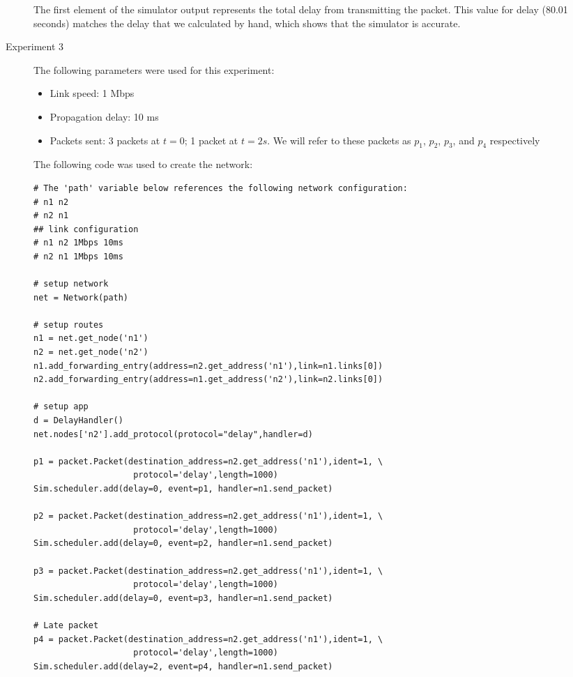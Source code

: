 \documentclass[11pt]{article}
\begin{document}
\begin{description}
\medskip

The first element of the simulator output represents the total delay from transmitting the packet. This value for delay (80.01 seconds) matches the delay that we calculated by hand, which shows that the simulator is accurate.

\item[Experiment 3] \hfill \break
The following parameters were used for this experiment:

\begin{itemize}
\item Link speed: 1 Mbps
\item Propagation delay: 10 ms
\item Packets sent: 3 packets at $t = 0$; 1 packet at $t = 2s$. We will refer to these packets as $p_1$, $p_2$, $p_3$, and $p_4$ respectively
\end{itemize}

\medskip

The following code was used to create the network:

\medskip

\begin{lstlisting}
# The 'path' variable below references the following network configuration:
# n1 n2
# n2 n1
## link configuration
# n1 n2 1Mbps 10ms
# n2 n1 1Mbps 10ms

# setup network
net = Network(path)

# setup routes
n1 = net.get_node('n1')
n2 = net.get_node('n2')
n1.add_forwarding_entry(address=n2.get_address('n1'),link=n1.links[0])
n2.add_forwarding_entry(address=n1.get_address('n2'),link=n2.links[0])

# setup app
d = DelayHandler()
net.nodes['n2'].add_protocol(protocol="delay",handler=d)

p1 = packet.Packet(destination_address=n2.get_address('n1'),ident=1, \
                    protocol='delay',length=1000)
Sim.scheduler.add(delay=0, event=p1, handler=n1.send_packet)

p2 = packet.Packet(destination_address=n2.get_address('n1'),ident=1, \
                    protocol='delay',length=1000)
Sim.scheduler.add(delay=0, event=p2, handler=n1.send_packet)

p3 = packet.Packet(destination_address=n2.get_address('n1'),ident=1, \
                    protocol='delay',length=1000)
Sim.scheduler.add(delay=0, event=p3, handler=n1.send_packet)

# Late packet
p4 = packet.Packet(destination_address=n2.get_address('n1'),ident=1, \
                    protocol='delay',length=1000)
Sim.scheduler.add(delay=2, event=p4, handler=n1.send_packet)
\end{lstlisting}


\end{description}
\end{document}
